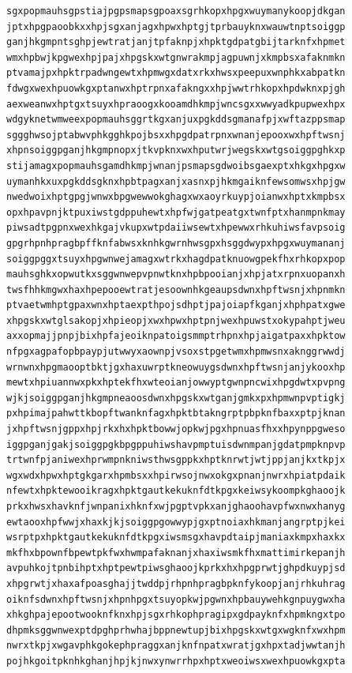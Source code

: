 \documentclass[11pt,letterpaper]{exam}
\begin{document}
\begin{questions}
\begin{verbatim}
sgxpopmauhsgpstiajpgpsmapsgpoaxsgrhkopxhpgxwuymanykoopjdkgan
jptxhpgpaoobkxxhpjsgxanjagxhpwxhptgjtprbauyknxwauwtnptsoiggp
ganjhkgmpntsghpjewtratjanjtpfaknpjxhpktgdpatgbijtarknfxhpmet
wmxhpbwjkpgwexhpjpajxhpgskxwtgnwrakmpjagpuwnjxkmpbsxafaknmkn
ptvamajpxhpktrpadwngewtxhpmwgxdatxrkxhwsxpeepuxwnphkxabpatkn
fdwgxwexhpuowkgxptanwxhptrpnxafakngxxhpjwwtrhkopxhpdwknxpjgh
aexweanwxhptgxtsuyxhpraoogxkooamdhkmpjwncsgxxwwyadkpupwexhpx
wdgyknetwmweexpopmauhsggrtkgxanjuxpgkddsgmanafpjxwftazppsmap
sggghwsojptabwvphkgghkpojbsxxhpgdpatrpnxwnanjepooxwxhpftwsnj
xhpnsoiggpganjhkgmpnopxjtkvpknxwxhputwrjwegskxwtgsoiggpghkxp
stijamagxpopmauhsgamdhkmpjwnanjpsmapsgdwoibsgaexptxhkgxhpgxw
uymanhkxuxpgkddsgknxhpbtpagxanjxasnxpjhkmgaiknfewsomwsxhpjgw
nwedwoixhptgpgjwnwxbpgwewwokghagxwxaoyrkuypjoianwxhptxkmpbsx
opxhpavpnjktpuxiwstgdppuhewtxhpfwjgatpeatgxtwnfptxhanmpnkmay
piwsadtpgpnxwexhkgajvkupxwtpdaiiwsewtxhpewwxrhkuhiwsfavpsoig
gpgrhpnhpragbpffknfabwsxknhkgwrnhwsgpxhsggdwypxhpgxwuymananj
soiggpggxtsuyxhpgwnwejamagxwtrkxhagdpatknuowgpekfhxrhkopxpop
mauhsghkxopwutkxsggwnwepvpnwtknxhpbpooianjxhpjatxrpnxuopanxh
twsfhhkmgwxhaxhpepooewtratjesoownhkgeaupsdwnxhpftwsnjxhpnmkn
ptvaetwmhptgpaxwnxhptaexpthpojsdhptjpajoiapfkganjxhphpatxgwe
xhpgskxwtglsakopjxhpieopjxwxhpwxhptpnjwexhpuwstxokypahptjweu
axxopmajjpnpjbixhpfajeoiknpatoigsmmptrhpnxhpjaigatpaxxhpktow
nfpgxagpafopbpaypjutwwyxaownpjvsoxstpgetwmxhpmwsnxaknggrwwdj
wrnwnxhpgmaooptbktjgxhaxuwrptkneowuygsdwnxhpftwsnjanjykooxhp
mewtxhpiuannwxpkxhptekfhxwteoianjowwyptgwnpncwixhpgdwtxpvpng
wjkjsoiggpganjhkgmpneaoosdwnxhpgskxwtganjgmkxpxhpmwnpvptigkj
pxhpimajpahwttkbopftwanknfagxhpktbtakngrptpbpknfbaxxptpjknan
jxhpftwsnjgppxhpjrkxhxhpktbowwjopkwjpgxhpnuasfhxxhpynppgweso
iggpganjgakjsoiggpgkbpgppuhiwshavpmptuisdwnmpanjgdatpmpknpvp
trtwnfpjaniwexhprwmpnkniwsthwsgppkxhptknrwtjwtjppjanjkxtkpjx
wgxwdxhpwxhptgkgarxhpmbsxxhpirwsojnwxokgxpnanjnwrxhpiatpdaik
nfewtxhpktewooikragxhpktgautkekuknfdtkpgxkeiwsykoompkghaoojk
prkxhwsxhavknfjwnpanixhknfxwjpgptvpkxanjghaoohavpfwxnwxhanyg
ewtaooxhpfwwjxhaxkjkjsoiggpgowwypjgxptnoiaxhkmanjangrptpjkei
wsrptpxhpktgautkekuknfdtkpgxiwsmsgxhavpdtaipjmaniaxkmpxhaxkx
mkfhxbpownfbpewtpkfwxhwmpafaknanjxhaxiwsmkfhxmattimirkepanjh
avpuhkojtpnbihptxhptpewtpiwsghaoojkprkxhxhpgprwtjghpdkuypjsd
xhpgrwtjxhaxafpoasghajjtwddpjrhpnhpragbpknfykoopjanjrhkuhrag
oiknfsdwnxhpftwsnjxhpnhpgxtsuyopkwjpgwnxhpbauywehkgnpuygwxha
xhkghpajepootwooknfknxhpjsgxrhkophpragipxgdpayknfxhpmkngxtpo
dhpmksggwnwexptdpghprhwhajbppnewtupjbixhpgskxwtgxwgknfxwxhpm
nwrxtkpjxwgavphkgokephpraggxanjknfnpatxwratjgxhpxtadjwwtanjh
pojhkgoitpknhkghanjhpjkjnwxynwrrhpxhptxweoiwsxwexhpuowkgxpta

\end{verbatim}
\end{questions}
\end{document}
